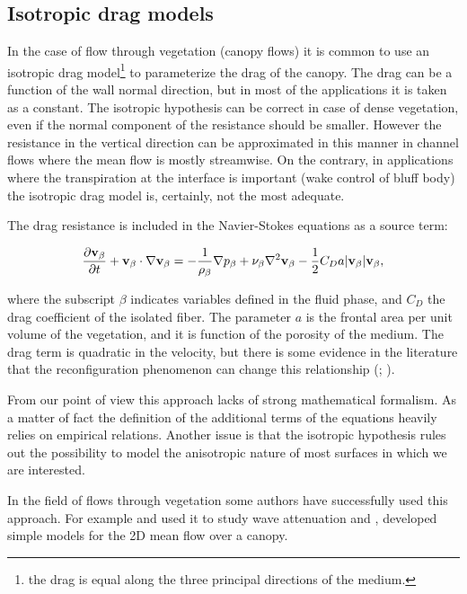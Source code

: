 \subsection{Isotropic drag models}
\label{sec:canopy_eq}

In the case of flow through vegetation (canopy flows) it is common to use an isotropic drag model\footnote{the drag is equal along the three principal directions of the medium.} to parameterize the drag of the canopy.
The drag can be a function of the wall normal direction, but in most of the applications it is taken as a constant.
The isotropic hypothesis can be correct in case of dense vegetation, even if the normal component of the resistance should be smaller.
However the resistance in the vertical direction can be approximated in this manner in channel flows where the mean flow is mostly streamwise. On the contrary, in applications where the transpiration at the interface is important (wake control of bluff body) the isotropic drag model is, certainly, not the most adequate.

The drag resistance is included in the Navier-Stokes equations as a source term:

\begin{equation}
\dfrac{\partial \textbf{v}_{\beta}}{\partial t} + \textbf{v}_{\beta} \cdot \nabla \textbf{v}_{\beta} = -\frac{1}{\rho_{\beta}} \nabla p_{\beta} + \nu_{\beta} \nabla^2 \textbf{v}_{\beta} - \dfrac{1}{2} C_D a |\textbf{v}_{\beta}| \textbf{v}_{\beta}, 
\label{eq:mom_cd}
\end{equation}

where the subscript $\beta$ indicates variables defined in the fluid phase, and $C_D$ the drag coefficient of the isolated fiber.
The parameter $a$ is the frontal area per unit volume of the vegetation, and it is function of the porosity of the medium.
The drag term is quadratic in the velocity, but there is some evidence in the literature that the reconfiguration phenomenon can change this relationship (\citet{gosselin2011drag}; \citet{alvarado2017nature}).

From our point of view this approach lacks of strong mathematical formalism. As a matter of fact the definition of the additional terms of the equations heavily relies on empirical relations.
Another issue is that the isotropic hypothesis rules out the possibility to model the anisotropic nature of most surfaces in which we are interested. %

In the field of flows through vegetation some authors have successfully used this approach. For example \citet{maza2013coupled} and \citet{maza2015tsunami} used it to study wave attenuation and \citet{ghisalberti2004limited}, \citet{battiato2014single} developed simple models for the 2D mean flow over a canopy.


